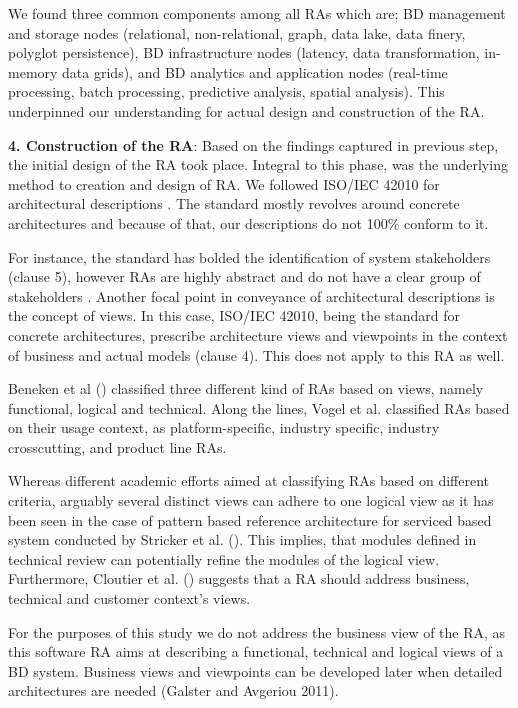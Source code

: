 \documentclass[10pt, conference]{IEEEtran}
\begin{document}
We found three common components among all RAs which are; BD management and storage nodes (relational, non-relational, graph, data lake, data finery, polyglot persistence), BD infrastructure nodes (latency, data transformation, in-memory data grids), and BD analytics and application nodes (real-time processing, batch processing, predictive analysis, spatial analysis). This underpinned our understanding for actual design and construction of the RA.

\textbf{4. Construction of the RA}: Based on the findings captured in previous step, the initial design of the RA took place. Integral to this phase, was the underlying method to creation and design of RA. We followed ISO/IEC 42010 for architectural descriptions \cite{Chaabane}. The standard mostly revolves around concrete architectures and because of that, our descriptions do not 100\% conform to it.

For instance, the standard has bolded the identification of system stakeholders (clause 5), however RAs are highly abstract and do not have a clear group of stakeholders \cite{AtaeiACIS}. Another focal point in conveyance of architectural descriptions is the concept of views. In this case, ISO/IEC 42010, being the standard for concrete architectures, prescribe architecture views and viewpoints in the context of business and actual models (clause 4). This does not apply to this RA as well.

Beneken et al (\cite{Beneken}) classified three different kind of RAs based on views, namely functional, logical and technical. Along the lines, Vogel et al. \cite{Vogel} classified RAs based on their usage context, as platform-specific, industry specific, industry crosscutting, and product line RAs.

Whereas different academic efforts aimed at classifying RAs based on different criteria, arguably several distinct views can adhere to one logical view as it has been seen in the case of pattern based reference architecture for serviced based system conducted by Stricker et al. (\cite{Stricker}). This implies, that modules defined in technical review can potentially refine the modules of the logical view. Furthermore, Cloutier et al. (\cite{Cloutier}) suggests that a RA should address business, technical and customer context’s views.

For the purposes of this study we do not address the business view of the RA, as this software RA aims at describing a functional, technical and logical views of a BD system. Business views and viewpoints can be developed later when detailed architectures are needed (Galster and Avgeriou 2011).
\end{document}

